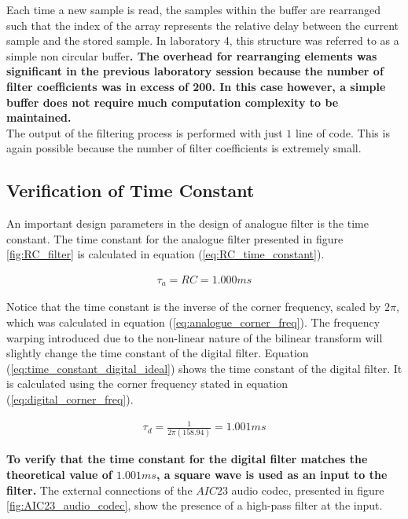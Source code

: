 \documentclass{article}
\begin{document}
Each time a new sample is read, the samples within the buffer are rearranged such that the index of the array represents the relative delay between the current sample and the stored sample. In laboratory 4, this structure was referred to as a simple non circular buffer\textbf{. The overhead for rearranging elements was significant in the previous laboratory session because the number of filter coefficients was in excess of 200. In this case however, a simple buffer does not require much computation complexity to be maintained.} \\

The output of the filtering process is performed with just $1$ line of code. This is again possible because the number of filter coefficients is extremely small.

\subsection{Verification of Time Constant}\label{sec:time_const}

An important design parameters in the design of analogue filter is the time constant. The time constant for the analogue filter presented in figure \ref{fig:RC_filter} is calculated in equation (\ref{eq:RC_time_constant}).

\begin{align}
    \tau_{a} = RC = 1.000ms\label{eq:RC_time_constant}
\end{align}

Notice that the time constant is the inverse of the corner frequency, scaled by $2\pi$, which was calculated in equation (\ref{eq:analogue_corner_freq}). The frequency warping introduced due to the non-linear nature of the bilinear transform will slightly change the time constant of the digital filter. Equation (\ref{eq:time_constant_digital_ideal}) shows the time constant of the digital filter. It is calculated using the corner frequency stated in equation (\ref{eq:digital_corner_freq}).

\begin{align}
    \tau_{d} = \frac{1}{2\pi (158.94)}= 1.001ms\label{eq:time_constant_digital_ideal}
\end{align}

\textbf{To verify that the time constant for the digital filter matches the theoretical value of $1.001ms$, a square wave is used as an input to the filter.} The external connections of the $AIC23$ audio codec, presented in figure \ref{fig:AIC23_audio_codec}, show the presence of a high-pass filter at the input. 
\end{document}
